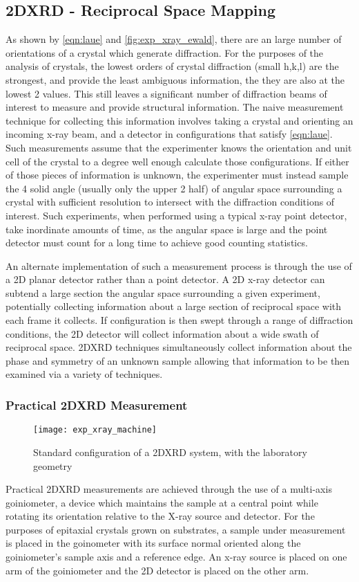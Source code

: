 \subsection{2DXRD - Reciprocal Space Mapping}
\label{sec:2DXRD} As shown by \cref{eqn:laue} and \cref{fig:exp_xray_ewald}, there are an large number of orientations of a crystal which generate diffraction. For the purposes of the analysis of crystals, the lowest orders of crystal diffraction (small h,k,l) are the strongest, and provide the least ambiguous information, the they are also at the lowest 2\texttheta{} values. This still leaves a significant number of diffraction beams of interest to measure and provide structural information. The naive measurement technique for collecting this information involves taking a crystal and orienting an incoming x-ray beam, and a detector in configurations that satisfy \cref{eqn:laue}. Such measurements assume that the experimenter knows the orientation and unit cell of the crystal to a degree well enough calculate those configurations. If either of those pieces of information is unknown, the experimenter must instead sample the 4\textpi{} solid angle (usually only the upper 2\textpi{} half) of angular space surrounding a crystal with sufficient resolution to intersect with the diffraction conditions of interest. Such experiments, when performed using a typical x-ray point detector, take inordinate amounts of time, as the angular space is large and the point detector must count for a long time to achieve good counting statistics.

An alternate implementation of such a measurement process is through the use of a 2D planar detector rather than a point detector. A 2D x-ray detector can subtend a large section the angular space surrounding a given experiment, potentially collecting information about a large section of reciprocal space with each frame it collects. If configuration is then swept through a range of diffraction conditions, the 2D detector will collect information about a wide swath of reciprocal space. 2DXRD techniques simultaneously collect information about the phase and symmetry of an unknown sample allowing that information to be then examined via a variety of techniques.

\subsubsection{Practical 2DXRD Measurement}
\begin{figure}
    \centering
    \texttt{[image: exp\_xray\_machine]}
    \caption{\label{fig:exp_xray_machine}Standard configuration of a 2DXRD system, with the laboratory geometry\cite{bobhe}}
\end{figure}
Practical 2DXRD measurements are achieved through the use of a multi-axis goiniometer, a device which maintains the sample at a central point while rotating its orientation relative to the X-ray source and detector. For the purposes of epitaxial crystals grown on substrates, a sample under measurement is placed in the goinometer with its surface normal oriented along the goiniometer's sample axis and a reference edge. An x-ray source is placed on one arm of the goiniometer and the 2D detector is placed on the other arm.

